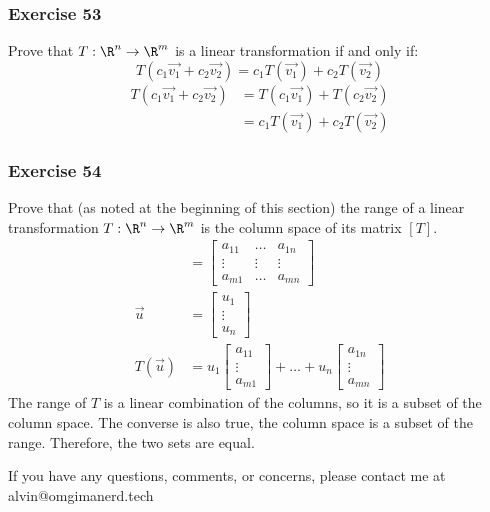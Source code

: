 \documentclass{math}
\begin{document}
\subsubsection*{Exercise 53}
Prove that \( T:\R^n\to\R^m \) is a linear transformation if and only if:
\[ T(c_1\vec{v_1}+c_2\vec{v_2}) = c_1T(\vec{v_1})+c_2T(\vec{v_2}) \]
\begin{align*}
  T(c_1\vec{v_1}+c_2\vec{v_2}) &= T(c_1\vec{v_1})+T(c_2\vec{v_2}) \\
  &= c_1T(\vec{v_1})+c_2T(\vec{v_2})
\end{align*}

\subsubsection*{Exercise 54}
Prove that (as noted at the beginning of this section) the range of a linear
transformation \( T:\R^n\to\R^m \) is the column space of its matrix \( [T] \).
\begin{align*}
  [T] &= \begin{bmatrix}
    a_{11} & \dots & a_{1n} \\
    \vdots & \vdots & \vdots \\
    a_{m1} & \dots & a_{mn}
  \end{bmatrix} \\
  \vec{u} &= \begin{bmatrix}u_1 \\ \vdots \\ u_n\end{bmatrix} \\
  T(\vec{u}) &= u_1\begin{bmatrix}a_{11} \\ \vdots \\ a_{m1}\end{bmatrix}+\dots+
    u_n\begin{bmatrix}a_{1n} \\ \vdots \\ a_{mn}\end{bmatrix}
\end{align*}
The range of \( T \) is a linear combination of the columns, so it is a subset
of the column space. The converse is also true, the column space is a subset of
the range. Therefore, the two sets are equal.

\begin{center}
  If you have any questions, comments, or concerns, please contact me at
  alvin@omgimanerd.tech
\end{center}
\end{document}
